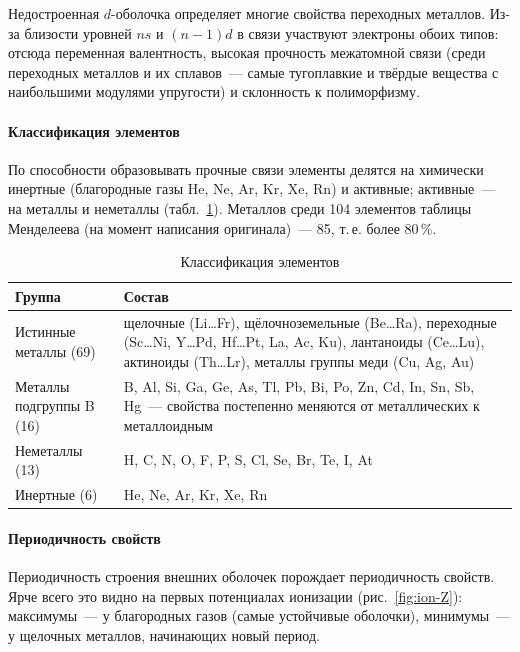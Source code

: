 \begin{glavnoe}
Недостроенная $d$-оболочка определяет многие свойства переходных металлов.
Из-за близости уровней $ns$ и $(n-1)d$ в связи участвуют электроны обоих
типов: отсюда переменная валентность, высокая прочность межатомной связи
(среди переходных металлов и их сплавов~— самые тугоплавкие и твёрдые
вещества с наибольшими модулями упругости) и склонность к полиморфизму.
\end{glavnoe}

\paragraph{Классификация элементов}
По способности образовывать прочные связи элементы делятся на химически
инертные (благородные газы He, Ne, Ar, Kr, Xe, Rn) и активные; активные~—
на металлы и неметаллы (табл.~\ref{tab:elements}). Металлов среди 104
элементов таблицы Менделеева (на момент написания оригинала)~— 85, т.\,е.
более 80\,\%.

\begin{table}[ht]
\centering
\caption{Классификация элементов}
\label{tab:elements}
\small
\begin{tabularx}{\textwidth}{@{}>{\raggedright\arraybackslash}p{38mm}>{\raggedright\arraybackslash}X@{}}
\toprule
Группа & Состав \\
\midrule
Истинные металлы (69) & щелочные (Li\ldots Fr), щёлочноземельные (Be\ldots Ra),
  переходные (Sc\ldots Ni, Y\ldots Pd, Hf\ldots Pt, La, Ac, Ku), лантаноиды (Ce\ldots Lu),
  актиноиды (Th\ldots Lr), металлы группы меди (Cu, Ag, Au) \\
Металлы подгруппы B (16) & B, Al, Si, Ga, Ge, As, Tl, Pb, Bi, Po, Zn, Cd, In, Sn, Sb, Hg~—
  свойства постепенно меняются от металлических к металлоидным \\
Неметаллы (13) & H, C, N, O, F, P, S, Cl, Se, Br, Te, I, At \\
Инертные (6) & He, Ne, Ar, Kr, Xe, Rn \\
\bottomrule
\end{tabularx}
\end{table}

\paragraph{Периодичность свойств}
Периодичность строения внешних оболочек порождает периодичность свойств.
Ярче всего это видно на первых потенциалах ионизации
(рис.~\ref{fig:ion-Z}): максимумы~— у благородных газов (самые
устойчивые оболочки), минимумы~— у щелочных металлов, начинающих новый
период.

